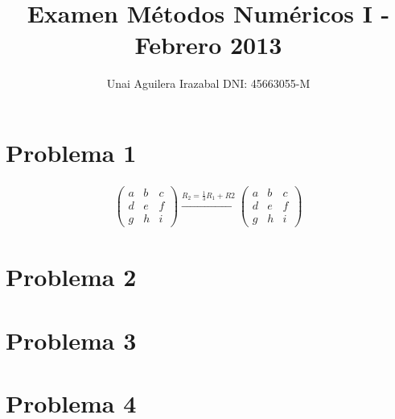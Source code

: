 \documentclass[a4paper, 12pt]{article}
\title{Examen Métodos Numéricos I - Febrero 2013}
\author{Unai Aguilera Irazabal DNI: 45663055-M}
\begin{document}
\maketitle

\section*{Problema 1}

\begin{align*}
\begin{pmatrix}
  a & b & c \\
  d & e & f \\
  g & h & i
\end{pmatrix} 
\xrightarrow{R_2 = \frac{1}{3}R_1 + R2}
\begin{pmatrix}
  a & b & c \\
  d & e & f \\
  g & h & i
\end{pmatrix}
\end{align*}

\section*{Problema 2}

\section*{Problema 3}

\section*{Problema 4}
\end{document}

